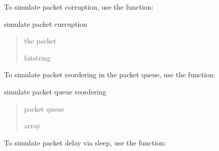 \documentclass[letterpaper,10pt,english,openany,oneside]{sphinxmanual}
\begin{document}
\sphinxAtStartPar
To simulate packet corruption, use the  function:

\begin{fulllineitems}
\label{\detokenize{index:intermediary.simulate_corruption}}
\pysigstartsignatures
\pysiglinewithargsret
{}
{}
{}
\pysigstopsignatures
\sphinxAtStartPar
simulate packet curruption
\begin{quote}\begin{description}
\sphinxAtStartPar
the packet

\sphinxAtStartPar
bitstring

\end{description}\end{quote}

\end{fulllineitems}


\sphinxAtStartPar
To simulate packet reordering in the packet queue, use the  function:

\begin{fulllineitems}
\label{\detokenize{index:intermediary.simulate_reordering}}
\pysigstartsignatures
\pysiglinewithargsret
{}
{}
{}
\pysigstopsignatures
\sphinxAtStartPar
simulate packet queue reordering
\begin{quote}\begin{description}
\sphinxAtStartPar
packet queue

\sphinxAtStartPar
array

\end{description}\end{quote}

\end{fulllineitems}


\sphinxAtStartPar
To simulate packet delay via sleep, use the  function:
\end{document}
